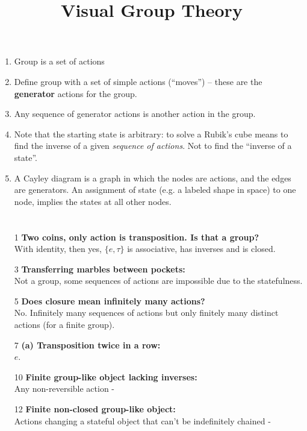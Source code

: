 \documentclass[12pt]{article}
\begin{document}
\title{Visual Group Theory}
\author{}
\date{}
\maketitle

\begin{enumerate}
\item Group is a set of actions
\item Define group with a set of simple actions (``moves'') -- these are the {\bf generator}
  actions for the group.
\item Any sequence of generator actions is another action in the group.
\item Note that the starting state is arbitrary: to solve a Rubik's cube means to find the inverse
  of a given \emph{sequence of actions}. Not to find the ``inverse of a state''.
\item A Cayley diagram is a graph in which the nodes are actions, and the edges are generators. An
  assignment of state (e.g. a labeled shape in space) to one node, implies the states at all other
  nodes.
\end{enumerate}

\section{}
\begin{enumerate}
\item[1] {\bf Two coins, only action is transposition. Is that a group?}\\
  With identity, then yes, $\{e, \tau\}$ is associative, has inverses and is closed. \checkmark
\item[3] {\bf Transferring marbles between pockets:}\\
  Not a group, some sequences of actions are impossible due to the statefulness. \checkmark
\item[5] {\bf Does closure mean infinitely many actions?}\\
  No. Infinitely many sequences of actions but only finitely many distinct actions (for a finite
  group). \checkmark
\item[7] {\bf (a) Transposition twice in a row:}\\
  $e$. \checkmark
\item[10] {\bf Finite group-like object lacking inverses:}\\
  Any non-reversible action - \checkmark
\item[12] {\bf Finite non-closed group-like object:}\\
  Actions changing a stateful object that can't be indefinitely chained - \checkmark
\end{enumerate}
\end{document}
